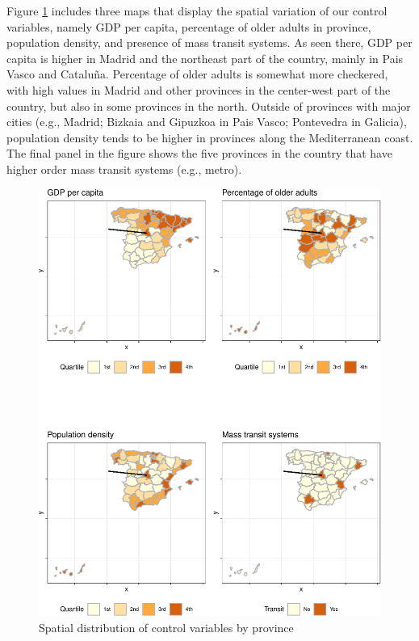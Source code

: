 \documentclass[]{elsarticle} %
\makeatletter
\def\maxwidth{\ifdim\Gin@nat@width>\linewidth\linewidth
\else\Gin@nat@width\fi}
\let\Oldincludegraphics\includegraphics
\renewcommand{\includegraphics}[1]{\Oldincludegraphics[width=\maxwidth]{#1}}
\makeatother
\begin{document}
Figure \ref{fig:map-controls} includes three maps that display the
spatial variation of our control variables, namely GDP per capita,
percentage of older adults in province, population density, and presence
of mass transit systems. As seen there, GDP per capita is higher in
Madrid and the northeast part of the country, mainly in Pais Vasco and
Cataluña. Percentage of older adults is somewhat more checkered, with
high values in Madrid and other provinces in the center-west part of the
country, but also in some provinces in the north. Outside of provinces
with major cities (e.g., Madrid; Bizkaia and Gipuzkoa in Pais Vasco;
Pontevedra in Galicia), population density tends to be higher in
provinces along the Mediterranean coast. The final panel in the figure
shows the five provinces in the country that have higher order mass
transit systems (e.g., metro).

\begin{figure}
\centering
\includegraphics{Environmental-Correlates-of-COVID19-Spain_files/figure-latex/map-controls-1.pdf}
\caption{\label{fig:map-controls}Spatial distribution of control
variables by province}
\end{figure}
\end{document}
